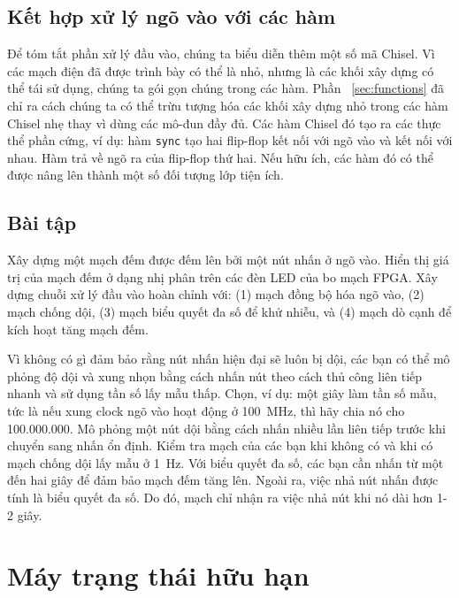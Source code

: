 \documentclass[%
    10pt,
    headinclude, footexclude,
    openright, %
    notitlepage,
    cleardoubleempty,
    headsepline,
    pointlessnumbers,
    bibtotoc, idxtotoc,
    ]{scrbook}
\newcommand{\code}[1]{{\small{\texttt{#1}}}}
\begin{document}
\section{Kết hợp xử lý ngõ vào với các hàm}

Để tóm tắt phần xử lý đầu vào, chúng ta biểu diễn thêm một số mã Chisel. Vì các mạch điện đã được trình bày có thể là nhỏ, nhưng là các khối xây dựng có thể tái sử dụng, chúng ta gói gọn chúng trong các hàm. Phần ~\ref{sec:functions} đã chỉ ra cách chúng ta có thể trừu tượng hóa các khối xây dựng nhỏ trong các hàm Chisel nhẹ thay vì dùng các mô-đun đầy đủ. Các hàm Chisel đó tạo ra các thực thể phần cứng, ví dụ: hàm \code{sync} tạo hai flip-flop kết nối với ngõ vào và kết nối với nhau. Hàm trả về ngõ ra của flip-flop thứ hai. Nếu hữu ích, các hàm đó có thể được nâng lên thành một số đối tượng lớp tiện ích. 


\section{Bài tập}

Xây dựng một mạch đếm được đếm lên bởi một nút nhấn ở ngõ vào. Hiển thị giá trị của mạch đếm ở dạng nhị phân trên các đèn LED của bo mạch FPGA. Xây dựng chuỗi xử lý đầu vào hoàn chỉnh với: (1) mạch đồng bộ hóa ngõ vào, (2) mạch chống dội, (3) mạch biểu quyết đa số để khử nhiễu, và (4) mạch dò cạnh để kích hoạt tăng mạch đếm.

Vì không có gì đảm bảo rằng nút nhấn hiện đại sẽ luôn bị dội, các bạn có thể mô phỏng độ dội và xung nhọn bằng cách nhấn nút theo cách thủ công liên tiếp nhanh và sử dụng tần số lấy mẫu thấp. Chọn, ví dụ: một giây làm tần số mẫu, tức là nếu xung clock ngõ vào hoạt động ở 100~MHz, thì hãy chia nó cho 100.000.000. Mô phỏng một nút dội bằng cách nhấn nhiều lần liên tiếp trước khi chuyển sang nhấn ổn định. Kiểm tra mạch của các bạn khi không có và khi có mạch chống dội lấy mẫu ở 1~Hz. Với biểu quyết đa số, các bạn cần nhấn từ một đến hai giây để đảm bảo mạch đếm tăng lên. Ngoài ra, việc nhả nút nhấn được tính là biểu quyết đa số. Do đó, mạch chỉ nhận ra việc nhả nút khi nó dài hơn 1-2 giây. 

\chapter{Máy trạng thái hữu hạn}
\end{document}
